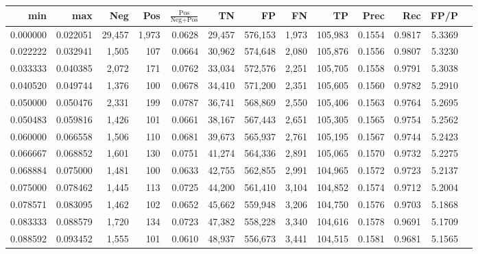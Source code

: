 \begin{tabular}{rrrrrrrrrrrrr}
\toprule
     min &      max &    Neg &   Pos & $\frac{\text{Pos}}{\text{Neg}+\text{Pos}}$ &      TN &      FP &      FN &      TP &   Prec &    Rec &   FP/P \\
\midrule
0.000000 & 0.022051 & 29,457 & 1,973 &                                     0.0628 &  29,457 & 576,153 &   1,973 & 105,983 & 0.1554 & 0.9817 & 5.3369 \\
0.022222 & 0.032941 &  1,505 &   107 &                                     0.0664 &  30,962 & 574,648 &   2,080 & 105,876 & 0.1556 & 0.9807 & 5.3230 \\
0.033333 & 0.040385 &  2,072 &   171 &                                     0.0762 &  33,034 & 572,576 &   2,251 & 105,705 & 0.1558 & 0.9791 & 5.3038 \\
0.040520 & 0.049744 &  1,376 &   100 &                                     0.0678 &  34,410 & 571,200 &   2,351 & 105,605 & 0.1560 & 0.9782 & 5.2910 \\
0.050000 & 0.050476 &  2,331 &   199 &                                     0.0787 &  36,741 & 568,869 &   2,550 & 105,406 & 0.1563 & 0.9764 & 5.2695 \\
0.050483 & 0.059816 &  1,426 &   101 &                                     0.0661 &  38,167 & 567,443 &   2,651 & 105,305 & 0.1565 & 0.9754 & 5.2562 \\
0.060000 & 0.066558 &  1,506 &   110 &                                     0.0681 &  39,673 & 565,937 &   2,761 & 105,195 & 0.1567 & 0.9744 & 5.2423 \\
0.066667 & 0.068852 &  1,601 &   130 &                                     0.0751 &  41,274 & 564,336 &   2,891 & 105,065 & 0.1570 & 0.9732 & 5.2275 \\
0.068884 & 0.075000 &  1,481 &   100 &                                     0.0633 &  42,755 & 562,855 &   2,991 & 104,965 & 0.1572 & 0.9723 & 5.2137 \\
0.075000 & 0.078462 &  1,445 &   113 &                                     0.0725 &  44,200 & 561,410 &   3,104 & 104,852 & 0.1574 & 0.9712 & 5.2004 \\
0.078571 & 0.083095 &  1,462 &   102 &                                     0.0652 &  45,662 & 559,948 &   3,206 & 104,750 & 0.1576 & 0.9703 & 5.1868 \\
0.083333 & 0.088579 &  1,720 &   134 &                                     0.0723 &  47,382 & 558,228 &   3,340 & 104,616 & 0.1578 & 0.9691 & 5.1709 \\
0.088592 & 0.093452 &  1,555 &   101 &                                     0.0610 &  48,937 & 556,673 &   3,441 & 104,515 & 0.1581 & 0.9681 & 5.1565 \\

\end{tabular}
